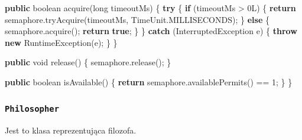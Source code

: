 \documentclass[11pt]{article}
\newenvironment{Shaded}{}{}
\newcommand{\KeywordTok}[1]{\textcolor[rgb]{0.00,0.44,0.13}{\textbf{{#1}}}}
\newcommand{\DataTypeTok}[1]{\textcolor[rgb]{0.56,0.13,0.00}{{#1}}}
\newcommand{\DecValTok}[1]{\textcolor[rgb]{0.25,0.63,0.44}{{#1}}}
\newcommand{\FunctionTok}[1]{\textcolor[rgb]{0.02,0.16,0.49}{{#1}}}
\newcommand{\NormalTok}[1]{{#1}}
\newcommand{\ControlFlowTok}[1]{\textcolor[rgb]{0.00,0.44,0.13}{\textbf{{#1}}}}
\newcommand{\OperatorTok}[1]{\textcolor[rgb]{0.40,0.40,0.40}{{#1}}}
\newcommand{\BuiltInTok}[1]{{#1}}
\begin{document}
\begin{Shaded}
\begin{Highlighting}[]
    \KeywordTok{public} \DataTypeTok{boolean} \FunctionTok{acquire}\OperatorTok{(}\DataTypeTok{long}\NormalTok{ timeoutMs}\OperatorTok{)} \OperatorTok{\{}
        \ControlFlowTok{try} \OperatorTok{\{}
            \ControlFlowTok{if} \OperatorTok{(}\NormalTok{timeoutMs }\OperatorTok{\textgreater{}} \DecValTok{0L}\OperatorTok{)} \OperatorTok{\{}
                \ControlFlowTok{return}\NormalTok{ semaphore}\OperatorTok{.}\FunctionTok{tryAcquire}\OperatorTok{(}\NormalTok{timeoutMs}\OperatorTok{,} \BuiltInTok{TimeUnit}\OperatorTok{.}\FunctionTok{MILLISECONDS}\OperatorTok{);}
            \OperatorTok{\}} \ControlFlowTok{else} \OperatorTok{\{}
\NormalTok{                semaphore}\OperatorTok{.}\FunctionTok{acquire}\OperatorTok{();}
                \ControlFlowTok{return} \KeywordTok{true}\OperatorTok{;}
            \OperatorTok{\}}
        \OperatorTok{\}} \ControlFlowTok{catch} \OperatorTok{(}\BuiltInTok{InterruptedException}\NormalTok{ e}\OperatorTok{)} \OperatorTok{\{}
            \ControlFlowTok{throw} \KeywordTok{new} \BuiltInTok{RuntimeException}\OperatorTok{(}\NormalTok{e}\OperatorTok{);}
        \OperatorTok{\}}
    \OperatorTok{\}}

    \KeywordTok{public} \DataTypeTok{void} \FunctionTok{release}\OperatorTok{()} \OperatorTok{\{}
\NormalTok{        semaphore}\OperatorTok{.}\FunctionTok{release}\OperatorTok{();}
    \OperatorTok{\}}

    \KeywordTok{public} \DataTypeTok{boolean} \FunctionTok{isAvailable}\OperatorTok{()} \OperatorTok{\{}
        \ControlFlowTok{return}\NormalTok{ semaphore}\OperatorTok{.}\FunctionTok{availablePermits}\OperatorTok{()} \OperatorTok{==} \DecValTok{1}\OperatorTok{;}
    \OperatorTok{\}}
\OperatorTok{\}}
\end{Highlighting}
\end{Shaded}

    \hypertarget{philosopher}{%
\subsubsection{\texorpdfstring{\texttt{Philosopher}}{Philosopher}}\label{philosopher}}

Jest to klasa reprezentująca filozofa.
\end{document}
